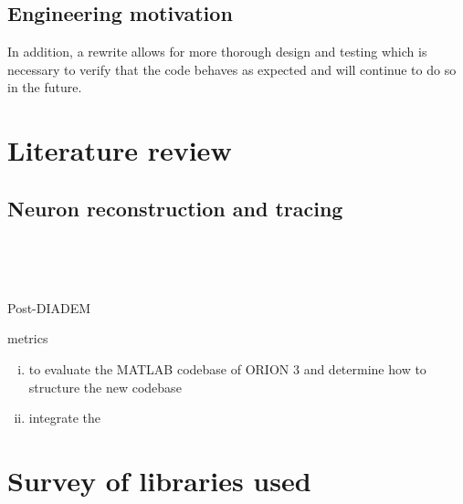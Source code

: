 \subsection{Engineering motivation}

In addition, a rewrite allows for more thorough
design and testing which is necessary to verify that the code
behaves as expected and will continue to do so in the future.

\section{Literature review}

\subsection{Neuron reconstruction and tracing}\label{subsec:neuron-tracing}

~\citep{Duke-Southampton-archive:Cannon:1998,DIADEM-dataset:Brown:2011,NeuroMorphVariability:Parekh:2015}

~\citep{DIADEM&Beyond:Liu:2011,NeuroMorphTrends:Halavi:2012,NeuroTracePerspect:Meijering:2010}

Post-DIADEM
~\citep{Bauer2010,MIA-anisotropic-path-searching-Xie2011,MICCAI-anisotropic-path-searching-Xie2010,
Jeong2015,Luo2015,De2015,Gulyanon2015,Santamaria-Pang2015,Mukherjee2014,Hernandez-Herrera2014,Basu2014,Xiao2013,Jimenez2013,Basu2013,Mukherjee2013,Hernandez-Herrera2013,Ming2013,Lee2012,Czarnecki2012}

metrics~\citep{Mayerich2011,Mayerich2012,btmorph-Torben-Nielsen2014,Costa2014,Gillette2015}

\begin{enumerate}[(i)]
\item to evaluate the MATLAB codebase of ORION 3 and determine how to structure the new codebase
\item integrate the
\end{enumerate}

%

\section{Survey of libraries used}


